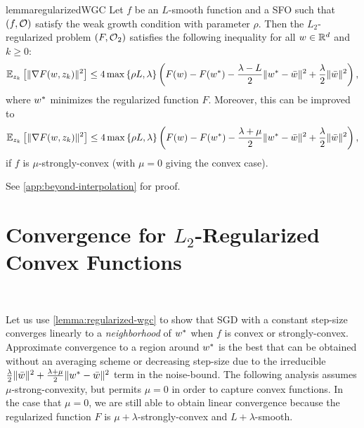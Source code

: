 \begin{restatable}{lemma}{regularizedWGC}\label{lemma:regularized-wgc}
    Let \( f \) be an \( L \)-smooth function and \oracle{} a SFO such that \( \rbr{f, \oracle{}} \) satisfy the weak growth condition with parameter \( \rho \).
    Then the \( L_2 \)-regularized problem \( \rbr{F, \oracle{}_2} \) satisfies the following inequality for all \( \w \in \R^d \) and \( k \geq 0 \):
    \[ \Ek\sbr{\norm{\nabla F(\w, \zk)}^2} \leq 4 \max\cbr{\rho L, \lambda} \rbr{F(\w) - F(\wopt) - \frac{\lambda - L}{2} \norm{\wopt - \wbar}^2 + \frac{\lambda}{2} \norm{\wbar}^2}, \]
    where \( \wopt \) minimizes the regularized function \( F \).
    Moreover, this can be improved to 
    \[ \Ek\sbr{\norm{\nabla F(\w, \zk)}^2} \leq 4 \max\cbr{\rho L, \lambda} \rbr{F(\w) - F(\wopt) - \frac{\lambda + \mu}{2} \norm{\wopt - \wbar}^2 + \frac{\lambda}{2} \norm{\wbar}^2}, \]
    if \( f \) is \( \mu \)-strongly-convex (with \( \mu = 0 \) giving the convex case).
\end{restatable}
\noindent See \autoref{app:beyond-interpolation} for proof.

\section{Convergence for \( L_2 \)-Regularized Convex Functions}~\label{sec:regularized-convex}

Let us use \autoref{lemma:regularized-wgc} to show that SGD with a constant step-size converges linearly to a \emph{neighborhood} of \( \wopt \) when \( f \) is convex or strongly-convex.
Approximate convergence to a region around \( \wopt \) is the best that can be obtained without an averaging scheme or decreasing step-size due to the irreducible \( \frac{\lambda}{2} \norm{\wbar}^2 + \frac{\lambda + \mu}{2} \norm{\wopt - \wbar}^2 \) term in the noise-bound.
The following analysis assumes \( \mu \)-strong-convexity, but permits \( \mu = 0 \) in order to capture convex functions.
In the case that \( \mu = 0 \), we are still able to obtain linear convergence because the regularized function \( F \) is \( \mu + \lambda \)-strongly-convex and \( L + \lambda \)-smooth. 


